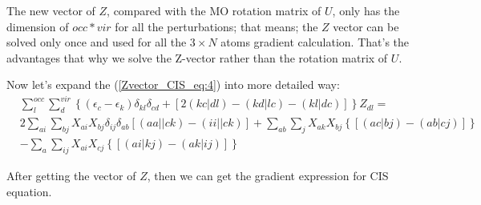 The new vector of $Z$, compared with the MO rotation matrix of $U$, only has
the dimension of $occ*vir$ for all the perturbations; that means; the $Z$ vector 
can be solved only once and used for all the $3\times N$ atoms gradient
calculation. That's the advantages that why we solve the Z-vector rather than
the rotation matrix of $U$. 

Now let's expand the (\ref{Zvector_CIS_eq:4}) into more detailed way:
\begin{equation}
 \begin{split}
&\sum_{l}^{occ}\sum_{d}^{vir}\left\lbrace   \left(\epsilon_{c} -
\epsilon_{k}\right)\delta_{kl}\delta_{cd} + \left[
2(kc|dl) -(kd|lc) - (kl|dc) \right] \right\rbrace Z_{dl} =  \\
&2\sum_{ai}\sum_{bj}X_{ai}X_{bj}
\delta_{ij}\delta_{ab}[(aa||ck) - (ii||ck)] 
+\sum_{ab}\sum_{j}X_{ak}X_{bj}\left\{\left[(ac|bj)
- (ab|cj)\right] \right\}  \\
&-\sum_{a}\sum_{ij}X_{ai}X_{cj}\left\{
\left[(ai|kj)-(ak|ij)\right] \right\}
 \end{split}
 \label{Zvector_CIS_eq:5}
\end{equation}

After getting the vector of $Z$, then we can get the gradient expression for CIS equation.





